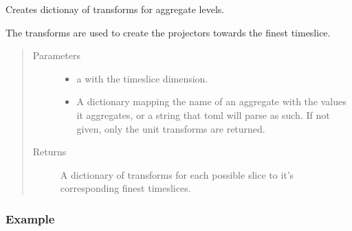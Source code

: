 \documentclass[letterpaper,10pt,english]{sphinxmanual}
\begin{document}
\begin{fulllineitems}
\label{\detokenize{api:muse.timeslices.aggregate_transforms}}
Creates dictionay of transforms for aggregate levels.

The transforms are used to create the projectors towards the finest timeslice.
\begin{quote}\begin{description}
\item[{Parameters}] \leavevmode\begin{itemize}
\item {} 
 \textendash{} a  with the timeslice dimension.

\item {} 
 \textendash{} A dictionary mapping the name of an aggregate with the values it
aggregates, or a string that toml will parse as such. If not given, only the
unit transforms are returned.

\end{itemize}

\item[{Returns}] \leavevmode
A dictionary of transforms for each possible slice to it’s corresponding finest
timeslices.

\end{description}\end{quote}
\subsubsection*{Example}


\end{fulllineitems}
\end{document}
